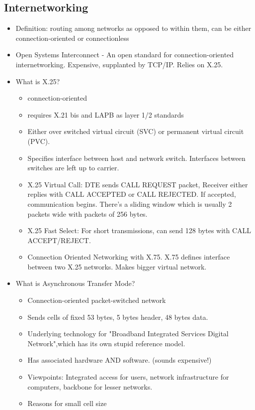 \documentclass{scrartcl}
\begin{document}
\subsection*{Internetworking}
\begin{itemize}
\item Definition: routing among networks as opposed to within them, can be 
either connection-oriented or connectionless
\item Open Systems Interconnect - An open standard for connection-oriented 
internetworking. Expensive, supplanted by TCP/IP. Relies on X.25.
\item What is X.25?
\begin{itemize}
\item connection-oriented
\item requires X.21 bis and LAPB as layer 1/2 standards
\item Either over switched virtual circuit (SVC) or permanent virtual circuit 
(PVC).
\item Specifies interface between host and network switch. Interfaces between 
switches are left up to carrier.
\item X.25 Virtual Call: DTE sends CALL REQUEST packet, Receiver either replies
 with CALL ACCEPTED or CALL REJECTED. If accepted, communication begins. 
 There's a sliding window which is usually 2 packets wide with packets of 256 
 bytes.
\item X.25 Fast Select: For short transmissions, can send 128 bytes with CALL
 ACCEPT/REJECT.
\item Connection Oriented Networking with X.75. X.75 defines interface between
 two X.25 networks. Makes bigger virtual network.
\end{itemize}
\item What is Asynchronous Transfer Mode?
\begin{itemize}
\item Connection-oriented packet-switched network
\item Sends cells of fixed 53 bytes, 5 bytes header, 48 bytes data.
\item Underlying technology for "Broadband Integrated Services Digital Network",which has its own stupid reference model.
\item Has associated hardware AND software. (sounds expensive!)
\item Viewpoints: Integrated access for users, network infrastructure for
 computers, backbone for lesser networks.
\item Reasons for small cell size

\end{itemize}
\end{itemize}
\end{document}
